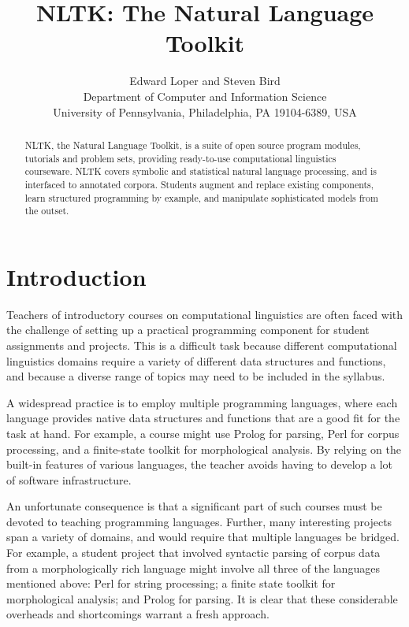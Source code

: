 \documentclass[11pt]{article}
\title{NLTK: The Natural Language Toolkit}
\author{
Edward Loper and Steven Bird\\
Department of Computer and Information Science \\
University of Pennsylvania, Philadelphia, PA 19104-6389, USA
}
\date{}
\begin{document}
\maketitle

\begin{abstract}
NLTK, the Natural Language Toolkit, is a suite of open source program modules,
tutorials and problem sets, providing ready-to-use computational
linguistics courseware.  NLTK covers symbolic and statistical natural
language processing, and is interfaced to annotated corpora.  Students
augment and replace existing components, learn structured
programming by example, and manipulate sophisticated models from the
outset.
\end{abstract}

\section{Introduction}

Teachers of introductory courses on computational linguistics are
often faced with the challenge of setting up a practical programming
component for student assignments and projects.  This is a difficult
task because different computational linguistics domains require a
variety of different data structures and functions, and because a
diverse range of topics may need to be included in the syllabus.

A widespread practice is to employ multiple programming languages,
where each language provides native data structures and functions that
are a good fit for the task at hand.  For example, a course might use
Prolog for parsing, Perl for corpus processing, and a finite-state
toolkit for morphological analysis.  By relying on the built-in
features of various languages, the teacher avoids having to develop a
lot of software infrastructure.

An unfortunate consequence is that a significant part of such courses
must be devoted to teaching programming languages.  Further, many
interesting projects span a variety of domains, and would require that
multiple languages be bridged.  For example, a student project that
involved syntactic parsing of corpus data from a morphologically rich
language might involve all three of the languages mentioned above:
Perl for string processing; a finite state toolkit for morphological
analysis; and Prolog for parsing.
It is clear that these considerable overheads and shortcomings warrant
a fresh approach.
\end{document}
